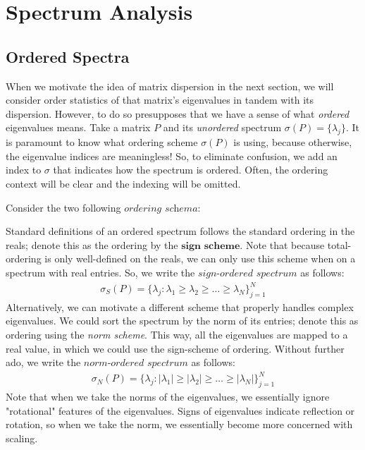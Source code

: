 \newpage
\section{Spectrum Analysis}


\subsection{Ordered Spectra}

When we motivate the idea of matrix dispersion in the next section, we will consider order statistics of that matrix's eigenvalues in tandem with its dispersion.
However, to do so presupposes that we have a sense of what \textit{ordered} eigenvalues means.
Take a matrix $P$ and its \textit{unordered} spectrum $\sigma(P) = \{\lambda_j\}$.
It is paramount to know what ordering scheme $\sigma(P)$ is using, because otherwise, the eigenvalue indices are meaningless!
So, to eliminate confusion, we add an index to $\sigma$ that indicates how the spectrum is ordered.
Often, the ordering context will be clear and the indexing will be omitted.


\noindent Consider the two following $\textit{ordering schema}$:

Standard definitions of an ordered spectrum follows the standard ordering in the reals; denote this as the ordering by the $\textbf{sign scheme}$.
Note that because total-ordering is only well-defined on the reals, we can only use this scheme when on a spectrum with real entries.
So, we write the $\textit{sign-ordered spectrum}$ as follows:
\begin{align*}
\sigma_S(P) = \{\lambda_j : \lambda_1 \geq \lambda_2 \geq \dots \geq \lambda_N\}_{j = 1}^N
\end{align*}
Alternatively, we can motivate a different scheme that properly handles complex eigenvalues.
We could sort the spectrum by the norm of its entries; denote this as ordering using the \textit{norm scheme}.
This way, all the eigenvalues are mapped to a real value, in which we could use the sign-scheme of ordering.
Without further ado, we write the $\textit{norm-ordered spectrum}$ as follows:
\begin{align*}
\sigma_N(P) = \{\lambda_j : |\lambda_1| \geq |\lambda_2| \geq \dots \geq |\lambda_N|\}_{j = 1}^N
\end{align*}
Note that when we take the norms of the eigenvalues, we essentially ignore "rotational" features of the eigenvalues.
Signs of eigenvalues indicate reflection or rotation, so when we take the norm, we essentially become more concerned with scaling.

